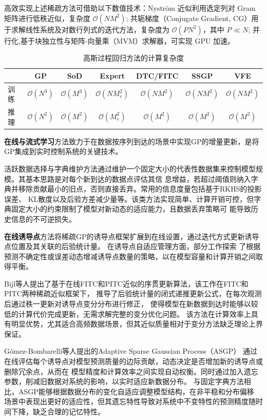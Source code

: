 高效实现上述稀疏方法可借助以下数值技术：Nyström 近似利用选定列对 Gram 矩阵进行低秩近似，复杂度 $\mathcal{O}(NM^2)$;
共轭梯度（Conjugate Gradient, CG）用于求解线性系统及对数行列式的迭代方法，复杂度为 $\mathcal{O}(PN^2)$，其中 $P \ll N$;
并行化,基于块独立性与矩阵-向量乘（MVM）求解器，可实现 GPU 加速。

\begin{table}[ht]
\centering
\caption{高斯过程回归方法的计算复杂度}
\label{tab:compute_complex}
\begin{tabular}{lcccccc}
\toprule
& GP & SoD & Expert & DTC/FITC & SSGP & VFE \\
\midrule
训练  & $\mathcal O(N^3)$ & $\mathcal O(M^3)$ & $\mathcal O(NM_e^2)$ & $\mathcal O(NM^2)$ & $\mathcal O(NM^2)$ & $\mathcal O(NM^2)$ \\
推理 & $\mathcal O(N^2)$ & $\mathcal O(M^2)$ & $\mathcal O(M_e^2)$  & $\mathcal O(M^2)$  & $\mathcal O(M^2)$  & $\mathcal O(M^2)$ \\
\bottomrule
\end{tabular}
\end{table}

\textbf{在线与流式学习}方法致力于在数据按序列到达的场景中实现GP的增量更新，是将GP集成到实时控制系统的关键技术。

活跃数据选择与字典维护方法通过维护一个固定大小的代表性数据集来控制模型规模。其基本思路是对每个新到达的数据点评估其信
息增益，若超过阈值则纳入字典并移除贡献最小的旧点，否则直接丢弃。常用的信息度量包括基于RKHS的投影误差\cite{petelin_2011_cs}、
KL散度以及后验方差减少量等。该类方法实现简单、计算开销可控，但字典固定大小的约束限制了模型对新动态的适应能力，且数据丢弃策略可
能导致历史信息的不可逆损失。

\textbf{在线诱导点}方法将稀疏GP的诱导点框架扩展到在线设置，通过迭代方式更新诱导点位置及其关联的后验统计量。
在诱导点自适应管理方面，部分工作探索
了根据预测不确定性或误差动态增减诱导点数量的策略，以在模型容量和计算开销之间取得平衡。

Bijl等人\cite{bijl_2015_online}提出了基于在线FITC和PITC近似的序贯更新算法，该工作在FITC和PITC两种稀疏近似框架下，
推导了后验统计量的闭式递推更新公式，在每次观测后通过秩一更新对诱导点变分分布进行修正，
使得模型在新数据到达时能够以较低的计算代价完成更新，无需求解完整的变分优化问题。
该方法在计算效率上具有明显优势，尤其适合高频数据场景，但其近似质量相对于变分方法缺乏理论上界保证。

Gómez-Bombarelli等人提出的Adaptive Sparse Gaussian Process（ASGP）\cite{gomez_asgp}
通过在线评估每个诱导点对模型预测质量的边际贡献，动态决定是否增加新的诱导点或删除冗余点，从而在
模型精度和计算效率之间实现自动权衡。同时通过加入遗忘参数，削减旧数据对系统的影响，以实时适应新数据分布。
与固定字典方法相比，ASGP能够根据数据分布的变化自适应调整模型结构，在非平稳和分布偏移
场景中表现出更好的适应性，但其遗忘特性导致对系统中不变特性的预测精度随时间下降，缺乏合理的记忆特性。

